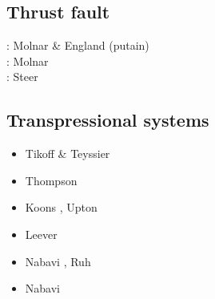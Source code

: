 \subsection{Thrust fault} 

\begin{scriptsize}
\nineteenninety: Molnar \& England \cite{moen90b} (putain)\\
\nineteenninetytwo: Molnar \cite{moln92} \\
\twothousandfourteen: Steer \etal \cite{stsc14}
\end{scriptsize}

\subsection{Transpressional systems} 

\begin{scriptsize}
\begin{itemize}
\item[\nineteenninetyfour] Tikoff \& Teyssier \cite{tite94}
\item[\nineteenninetyseven] Thompson \etal \cite{thsj97}
\item[\twothousandthree] Koons \etal \cite{konc03}, Upton \etal \cite{upke03}
\item[\twothousandeleven] Leever \etal \cite{legs11}
\item[\twothousandseventeen] Nabavi \etal \cite{naam17}, Ruh \etal \cite{rugb17}
\item[\twothousandeighteen] Nabavi \etal \cite{naam18}
\end{itemize}
\end{scriptsize}

